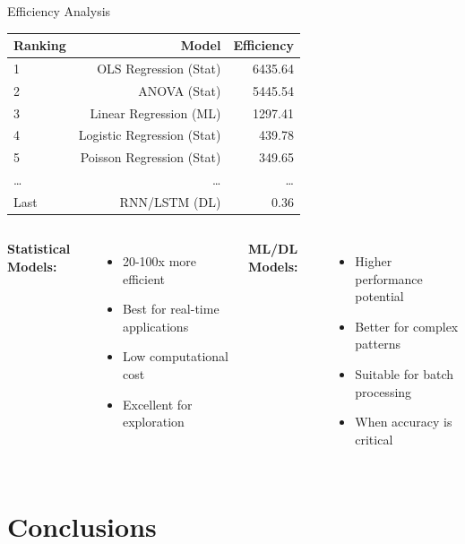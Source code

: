 \documentclass[aspectratio=169,10pt]{beamer}
\begin{document}
\begin{frame}{Efficiency Analysis}
\begin{center}
\begin{tabular}{lrr}
\toprule
\textbf{Ranking} & \textbf{Model} & \textbf{Efficiency} \\
\midrule
1 & OLS Regression (Stat) & \textcolor{accentcolor}{6435.64} \\
2 & ANOVA (Stat) & \textcolor{accentcolor}{5445.54} \\
3 & Linear Regression (ML) & 1297.41 \\
4 & Logistic Regression (Stat) & 439.78 \\
5 & Poisson Regression (Stat) & 349.65 \\
\ldots & \ldots & \ldots \\
Last & RNN/LSTM (DL) & 0.36 \\
\bottomrule
\end{tabular}
\end{center}

\vspace{0.5cm}

\begin{columns}
\textcolor{statcolor}{\textbf{Statistical Models:}}
\begin{itemize}
    \item 20-100x more efficient
    \item Best for real-time applications
    \item Low computational cost
    \item Excellent for exploration
\end{itemize}

\textcolor{mlcolor}{\textbf{ML/DL Models:}}
\begin{itemize}
    \item Higher performance potential
    \item Better for complex patterns
    \item Suitable for batch processing
    \item When accuracy is critical
\end{itemize}
\end{columns}
\end{frame}

\section{Conclusions}
\end{document}
